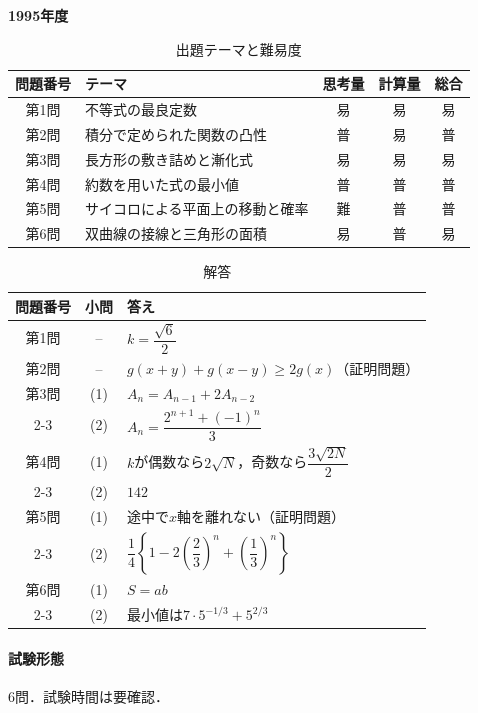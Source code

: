 \documentclass[../../main.tex]{subfiles}
\begin{document}
\begin{center}
  {\fontsize{48pt}{58pt}\selectfont \textbf{1995}\normalsize\textbf{年度}}
\end{center}

\begin{table}[htb]
  \centering
  \caption{出題テーマと難易度}
  \begin{tabular}{|c|p{6.2cm}|c|c|c|}
    \hline
    \textbf{問題番号} & \textbf{テーマ} & \textbf{思考量} & \textbf{計算量} & \textbf{総合} \\
    \hline
    第1問 & 不等式の最良定数 & 易 & 易 & 易 \\
    \hline
    第2問 & 積分で定められた関数の凸性 & 普 & 易 & 普 \\
    \hline
    第3問 & 長方形の敷き詰めと漸化式 & 易 & 易 & 易 \\
    \hline
    第4問 & 約数を用いた式の最小値 & 普 & 普 & 普 \\
    \hline
    第5問 & サイコロによる平面上の移動と確率 & 難 & 普 & 普 \\
    \hline
    第6問 & 双曲線の接線と三角形の面積 & 易 & 普 & 易 \\
    \hline
  \end{tabular}
\end{table}

\begin{table}[htb]
  \centering
  \caption{解答}
  \renewcommand{\arraystretch}{1.4}
  \begin{tabular}{|c|c|p{9cm}|}
    \hline
    \textbf{問題番号} & \textbf{小問} & \textbf{答え} \\
    \hline
    第1問 & -- & $k=\dfrac{\sqrt{6}}{2}$ \\
    \hline
    第2問 & -- & $g(x+y)+g(x-y)\ge 2g(x)$（証明問題） \\
    \hline
    第3問 & (1) & $A_n=A_{n-1}+2A_{n-2}$ \\
    \cline{2-3}
    & (2) & $A_n=\dfrac{2^{n+1}+(-1)^n}{3}$ \\
    \hline
    第4問 & (1) & $k$が偶数なら$2\sqrt{N}$，奇数なら$\dfrac{3\sqrt{2N}}{2}$ \\
    \cline{2-3}
    & (2) & $142$ \\
    \hline
    第5問 & (1) & 途中で$x$軸を離れない（証明問題） \\
    \cline{2-3}
    & (2) & $\dfrac{1}{4}\left\{1-2\left(\dfrac{2}{3}\right)^n+\left(\dfrac{1}{3}\right)^n\right\}$ \\
    \hline
    第6問 & (1) & $S=ab$ \\
    \cline{2-3}
    & (2) & 最小値は$7\cdot 5^{-1/3}+5^{2/3}$ \\
    \hline
  \end{tabular}
\end{table}

\paragraph{試験形態}
6問．試験時間は要確認．
\end{document}

